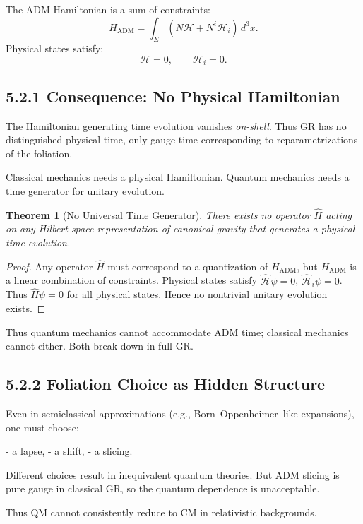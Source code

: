 \documentclass[12pt,oneside]{book}
\theoremstyle{plain}
\newtheorem{theorem}{Theorem}[chapter]
\theoremstyle{definition}
\begin{document}
The ADM Hamiltonian is a sum of constraints:
\[
H_{\mathrm{ADM}} = \int_{\Sigma} (N \mathcal{H} + N^i \mathcal{H}_i)\, d^3x.
\]
Physical states satisfy:
\[
\mathcal{H} = 0, \qquad \mathcal{H}_i = 0.
\]

\subsection{5.2.1 Consequence: No Physical Hamiltonian}

The Hamiltonian generating time evolution vanishes {\em on-shell}.  
Thus GR has no distinguished physical time, only gauge time corresponding to reparametrizations of the foliation.

Classical mechanics needs a physical Hamiltonian.  
Quantum mechanics needs a time generator for unitary evolution.

\begin{theorem}[No Universal Time Generator]
There exists no operator $\widehat{H}$ acting on any Hilbert space representation of canonical gravity that generates a physical time evolution.
\end{theorem}

\begin{proof}
Any operator $\widehat{H}$ must correspond to a quantization of $H_{\mathrm{ADM}}$, but $H_{\mathrm{ADM}}$ is a linear combination of constraints.  
Physical states satisfy $\widehat{\mathcal{H}} \psi = 0$, $\widehat{\mathcal{H}}_i \psi = 0$.  
Thus $\widehat{H}\psi = 0$ for all physical states.  
Hence no nontrivial unitary evolution exists.
\end{proof}

Thus quantum mechanics cannot accommodate ADM time; classical mechanics cannot either.  
Both break down in full GR.

\subsection{5.2.2 Foliation Choice as Hidden Structure}

Even in semiclassical approximations (e.g., Born–Oppenheimer–like expansions), one must choose:

- a lapse,
- a shift,
- a slicing.

Different choices result in inequivalent quantum theories.  
But ADM slicing is pure gauge in classical GR, so the quantum dependence is unacceptable.

Thus QM cannot consistently reduce to CM in relativistic backgrounds.
\end{document}
